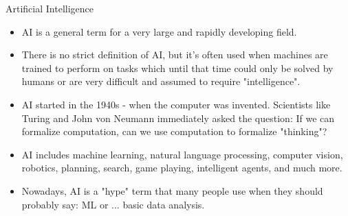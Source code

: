 \documentclass[11pt,compress,t,notes=noshow, xcolor=table]{beamer}
\begin{document}
\begin{frame}{Artificial Intelligence}

\begin{itemize}
	\item AI is a general term for a very large and rapidly developing field.
	\item There is no strict definition of AI, but it's often used when machines are trained to perform on tasks which until that time could only be solved by humans or are very difficult and assumed to require "intelligence".
    \item AI started in the 1940s - when the computer was invented. Scientists like 
        Turing and John von Neumann immediately asked the question:
        If we can formalize computation, can we use computation to formalize "thinking"?
	\item AI includes machine learning, natural language processing, computer vision, robotics, planning, search, game playing, intelligent agents, and much more.
    \item Nowadays, AI is a "hype" term that many people use when they should probably say: ML or ... basic data analysis.
\end{itemize}
  
\end{frame}

\end{document}
